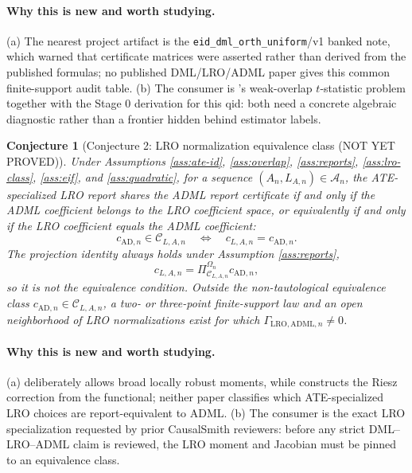 \documentclass[11pt]{article}
\theoremstyle{definition}
\theoremstyle{plain}
\newtheorem{conjecture}{Conjecture}
\theoremstyle{remark}
\begin{document}
\paragraph{Why this is new and worth studying.}
(a) The nearest project artifact is the \texttt{eid\_dml\_orth\_uniform}/v1
banked note, which warned that certificate matrices were asserted rather than
derived from the published formulas; no published DML/LRO/ADML paper gives
this common finite-support audit table.  (b) The consumer is
\citet{Dorn2025WeakOverlapDR}'s weak-overlap \(t\)-statistic problem together
with the Stage 0 derivation for this qid: both need a concrete algebraic
diagnostic rather than a frontier hidden behind estimator labels.

\begin{conjecture}[Conjecture 2: LRO normalization equivalence class (NOT YET PROVED)]\label{conj:lro-class}
Under Assumptions \ref{ass:ate-id}, \ref{ass:overlap}, \ref{ass:reports},
\ref{ass:lro-class}, \ref{ass:eif}, and \ref{ass:quadratic}, for a sequence
\((A_n,L_{A,n})\in\mathcal A_n\), the ATE-specialized LRO
report shares the ADML report certificate if and only if the ADML coefficient
belongs to the LRO coefficient space, or equivalently if and only if the LRO
coefficient equals the ADML coefficient:
\[
c_{\mathrm{AD},n}\in\mathcal C_{L,A,n}
\quad\Longleftrightarrow\quad
c_{L,A,n}=c_{\mathrm{AD},n}.
\]
The projection identity always holds under Assumption \ref{ass:reports},
\[
c_{L,A,n}=\Pi_{\mathcal C_{L,A,n}}^{\Omega_n}c_{\mathrm{AD},n},
\]
so it is not the
equivalence condition.  Outside the non-tautological equivalence class
\(c_{\mathrm{AD},n}\in\mathcal C_{L,A,n}\), a two- or three-point
finite-support law and an open neighborhood of LRO normalizations exist for
which
\(\Gamma_{\mathrm{LRO},\mathrm{ADML},n}\ne 0\).
\end{conjecture}
\paragraph{Why this is new and worth studying.}
(a) \citet{ChernozhukovEscancianoIchimuraNeweyRobins2022LRO} deliberately
allows broad locally robust moments, while
\citet{ChernozhukovNeweySingh2022ADML} constructs the Riesz correction from
the functional; neither paper classifies which ATE-specialized LRO choices are
report-equivalent to ADML.  (b) The consumer is the exact LRO specialization
requested by prior CausalSmith reviewers: before any strict DML--LRO--ADML
claim is reviewed, the LRO moment and Jacobian must be pinned to an
equivalence class.
\end{document}
